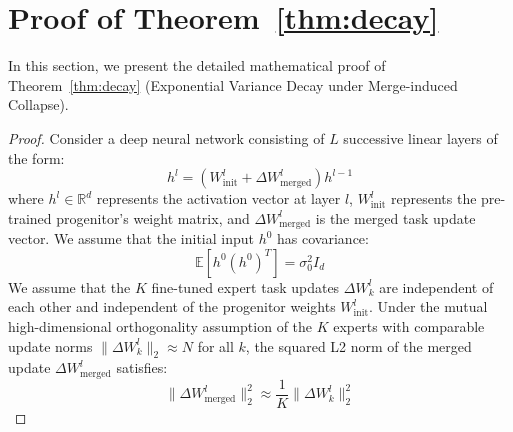 \documentclass{article}
\theoremstyle{plain}
\theoremstyle{definition}
\theoremstyle{remark}
\begin{document}



\newpage
\appendix
\onecolumn
\section{Proof of Theorem~\ref{thm:decay}}
\label{app:proof}

In this section, we present the detailed mathematical proof of Theorem~\ref{thm:decay} (Exponential Variance Decay under Merge-induced Collapse).

\begin{proof}
Consider a deep neural network consisting of $L$ successive linear layers of the form:
\begin{equation}
h^l = \left(W_{\text{init}}^l + \Delta W_{\text{merged}}^l\right) h^{l-1}
\end{equation}
where $h^l \in \mathbb{R}^d$ represents the activation vector at layer $l$, $W_{\text{init}}^l$ represents the pre-trained progenitor's weight matrix, and $\Delta W_{\text{merged}}^l$ is the merged task update vector. We assume that the initial input $h^0$ has covariance:
\begin{equation}
\mathbb{E}[h^0 (h^0)^T] = \sigma_0^2 I_d
\end{equation}
We assume that the $K$ fine-tuned expert task updates $\Delta W^l_k$ are independent of each other and independent of the progenitor weights $W_{\text{init}}^l$. Under the mutual high-dimensional orthogonality assumption of the $K$ experts with comparable update norms $\|\Delta W^l_k\|_2 \approx N$ for all $k$, the squared L2 norm of the merged update $\Delta W_{\text{merged}}^l$ satisfies:
\begin{equation}
\|\Delta W_{\text{merged}}^l\|_2^2 \approx \frac{1}{K} \|\Delta W_k^l\|_2^2
\end{equation}


\end{proof}
\end{document}
